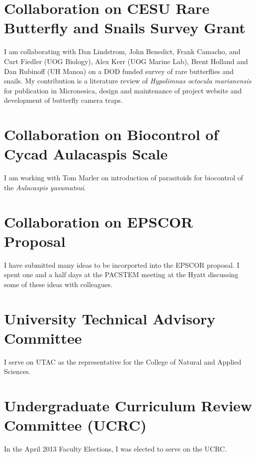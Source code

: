 \documentclass[12pt,oneside,english]{scrbook}
\begin{document}
\section{Collaboration on CESU Rare Butterfly and Snails Survey Grant}

I am collaborating with Dan Lindstrom, John Benedict, Frank Camacho,
and Curt Fiedler (UOG Biology), Alex Kerr (UOG Marine Lab), Brent
Holland and Dan Rubinoff (UH Manoa) on a DOD funded survey of rare
butterflies and snails. My contribution is a literature review of
\emph{Hypolimnas octocula marianensis} for publication in Micronesica,
design and maintenance of project website and development of butterfly
camera traps.

\section{Collaboration on Biocontrol of Cycad Aulacaspis Scale}

I am working with Tom Marler on introduction of parasitoids for biocontrol
of the \emph{Aulacaspis yasumatsui}.

\section{Collaboration on EPSCOR Proposal}

I have submitted many ideas to be incorported into the EPSCOR proposal.
I spent one and a half days at the PACSTEM meeting at the Hyatt discussing
some of these ideas with colleagues.

\section{University Technical Advisory Committee}

I serve on UTAC as the representative for the College of Natural and
Applied Sciences.

\section{Undergraduate Curriculum Review Committee (UCRC)}

In the April 2013 Faculty Elections, I was elected to serve on the
UCRC.
\end{document}
